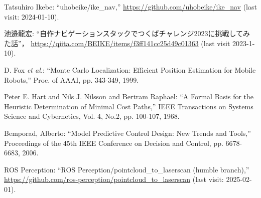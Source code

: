 \documentclass[twocolumn,9pt]{jsproceedings}
\begin{document}
\begin{thebibliography}{99}





  Tatsuhiro Ikebe: ``uhobeike/ike\_nav,'' \url{https://github.com/uhobeike/ike_nav} (last visit: 2024-01-10).

  池邉龍宏: ``自作ナビゲーションスタックでつくばチャレンジ2023に挑戦してみた話''，
  \url{https://qiita.com/BEIKE/items/f3ff141cc25d49c01363} (last visit 2023-1-10).


	  D. Fox {\it et al.}: ``Monte Carlo Localization: Efficient Position Estimation for Mobile Robots,''
  Proc. of AAAI, pp. 343-349, 1999.

  Peter E. Hart and Nils J. Nilsson and Bertram Raphael: ``A Formal Basis for the Heuristic Determination of Minimal Cost Paths,''
  IEEE Transactions on Systems Science and Cybernetics, Vol. 4, No.2, pp. 100-107, 1968.


  Bemporad, Alberto: ``Model Predictive Control Design: New Trends and Tools,''
  Proceedings of the 45th IEEE Conference on Decision and Control, pp. 6678-6683, 2006.

  ROS Perception: ``ROS Perception/pointcloud\_to\_laserscan (humble branch),'' \url{https://github.com/ros-perception/pointcloud_to_laserscan} (last visit: 2025-02-01).


\end{thebibliography}
\end{document}
